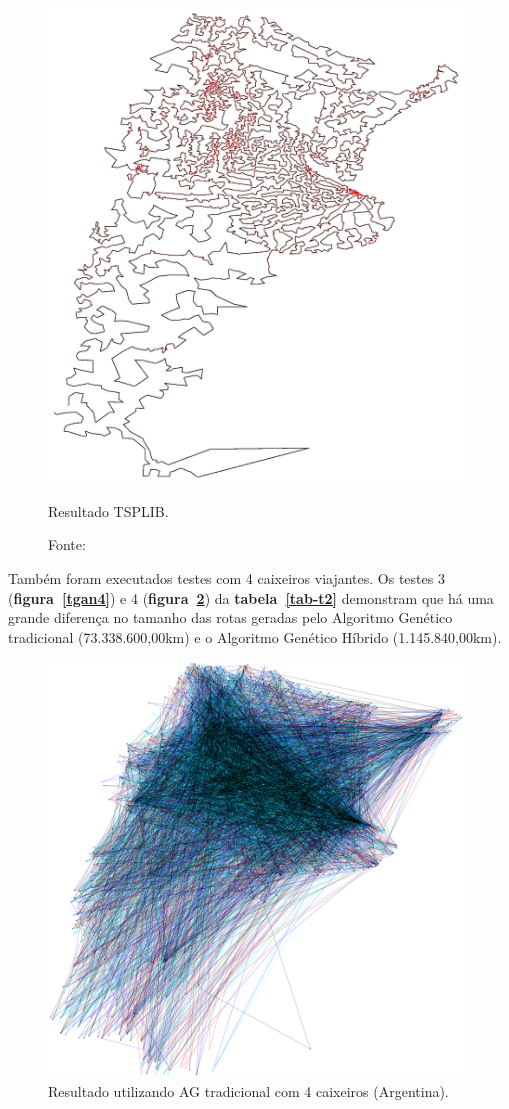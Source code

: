 \documentclass{abnt}
\begin{document}
	   		\begin{figure}[h]
				\centering
		        \includegraphics[width = 11cm,keepaspectratio]{img/artour}
		        \caption{Resultado TSPLIB.}
		        \caption*{Fonte: \cite{tsplib}}
		       
		        \label{arg}
	   	\end{figure}
	
		Também foram executados testes com 4 caixeiros viajantes. Os testes 3 (\textbf{figura~\ref{tgan4}}) e 4 (\textbf{figura~\ref{tga4}}) da \textbf{tabela~\ref{tab-t2}} demonstram que há uma grande diferença no tamanho das rotas geradas pelo Algoritmo Genético tradicional (73.338.600,00km) e o Algoritmo Genético Híbrido (1.145.840,00km).
		
		\begin{figure}[h]
				\centering
		        \includegraphics[width = 11cm,keepaspectratio]{img/output-4}
		        \caption{Resultado utilizando AG tradicional com 4 caixeiros (Argentina).}
		        \label{tga4}
	   	\end{figure}
	   		
\end{document}
